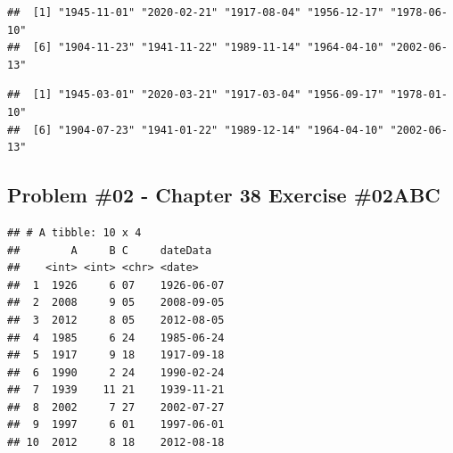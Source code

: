 \documentclass[
]{article}
\newenvironment{Shaded}{\begin{snugshade}}{\end{snugshade}}
\newcommand{\AttributeTok}[1]{\textcolor[rgb]{0.13,0.29,0.53}{#1}}
\newcommand{\CommentTok}[1]{\textcolor[rgb]{0.56,0.35,0.01}{\textit{#1}}}
\newcommand{\FunctionTok}[1]{\textcolor[rgb]{0.13,0.29,0.53}{\textbf{#1}}}
\newcommand{\NormalTok}[1]{#1}
\newcommand{\OtherTok}[1]{\textcolor[rgb]{0.56,0.35,0.01}{#1}}
\newcommand{\SpecialCharTok}[1]{\textcolor[rgb]{0.81,0.36,0.00}{\textbf{#1}}}
\begin{document}
\begin{Shaded}
\end{Shaded}

\begin{verbatim}
##  [1] "1945-11-01" "2020-02-21" "1917-08-04" "1956-12-17" "1978-06-10"
##  [6] "1904-11-23" "1941-11-22" "1989-11-14" "1964-04-10" "2002-06-13"
\end{verbatim}

\begin{Shaded}
\end{Shaded}

\begin{verbatim}
##  [1] "1945-03-01" "2020-03-21" "1917-03-04" "1956-09-17" "1978-01-10"
##  [6] "1904-07-23" "1941-01-22" "1989-12-14" "1964-04-10" "2002-06-13"
\end{verbatim}

\newpage

\hypertarget{problem-02---chapter-38-exercise-02abc}{%
\subsection{Problem \#02 - Chapter 38 Exercise
\#02ABC}\label{problem-02---chapter-38-exercise-02abc}}

\begin{Shaded}
\end{Shaded}

\begin{verbatim}
## # A tibble: 10 x 4
##        A     B C     dateData  
##    <int> <int> <chr> <date>    
##  1  1926     6 07    1926-06-07
##  2  2008     9 05    2008-09-05
##  3  2012     8 05    2012-08-05
##  4  1985     6 24    1985-06-24
##  5  1917     9 18    1917-09-18
##  6  1990     2 24    1990-02-24
##  7  1939    11 21    1939-11-21
##  8  2002     7 27    2002-07-27
##  9  1997     6 01    1997-06-01
## 10  2012     8 18    2012-08-18
\end{verbatim}
\end{document}
